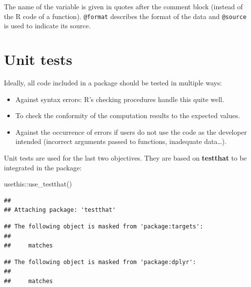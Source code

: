 \documentclass[
  12pt,
  american,
  a4paper,
  extrafontsizes,onecolumn,openright
  ]{memoir}
\newenvironment{Shaded}{\begin{snugshade}}{\end{snugshade}}
\newcommand{\FunctionTok}[1]{\textcolor[rgb]{0.00,0.00,0.00}{#1}}
\newcommand{\NormalTok}[1]{#1}
\newcommand{\SpecialCharTok}[1]{\textcolor[rgb]{0.00,0.00,0.00}{#1}}
\providecommand{\tightlist}{%
  \setlength{\itemsep}{0pt}\setlength{\parskip}{0pt}}
\begin{document}
\normalsize

The name of the variable is given in quotes after the comment block (instead of the R code of a function).
\texttt{@format} describes the format of the data and \texttt{@source} is used to indicate its source.

\hypertarget{unit-tests}{%
\section{Unit tests}\label{unit-tests}}

Ideally, all code included in a package should be tested in multiple ways:

\begin{itemize}
\tightlist
\item
  Against syntax errors: R's checking procedures handle this quite well.
\item
  To check the conformity of the computation results to the expected values.
\item
  Against the occurrence of errors if users do not use the code as the developer intended (incorrect arguments passed to functions, inadequate data\ldots).
\end{itemize}

Unit tests are used for the last two objectives.
They are based on \textbf{testthat} to be integrated in the package:

\scriptsize

\begin{Shaded}
\begin{Highlighting}[]
\NormalTok{usethis}\SpecialCharTok{::}\FunctionTok{use\_testthat}\NormalTok{()}
\end{Highlighting}
\end{Shaded}

\normalsize

\scriptsize

\begin{verbatim}
## 
## Attaching package: 'testthat'
\end{verbatim}

\begin{verbatim}
## The following object is masked from 'package:targets':
## 
##     matches
\end{verbatim}

\begin{verbatim}
## The following object is masked from 'package:dplyr':
## 
##     matches
\end{verbatim}
\end{document}
